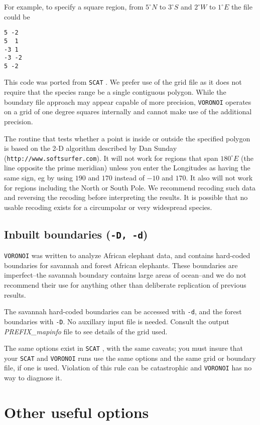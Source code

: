 \documentclass[10pt,titlepage,times,letterpaper]{article}
\def\SCAT{{\tt SCAT} }
\def\VORONOI{{\tt VORONOI} }
\begin{document}
For example, to specify a square region, from $5^\circ N$ to $3^\circ S$ and
$2^\circ W$ to $1^\circ E$ the file could be
\begin{verbatim}
5 -2
5  1
-3 1
-3 -2
5 -2
\end{verbatim}

This code was ported from \SCAT.  We prefer use of the grid file as it does not
require that the species range be a single contiguous polygon.  While the boundary
file approach may appear capable of more precision, \VORONOI operates on a grid of
one degree squares internally and cannot make use of the additional precision.

The routine that tests whether a point is inside or outside
the specified polygon is based on the 2-D algorithm 
described by Dan Sunday ({\tt http://www.softsurfer.com}). 
It will not work for regions that span
$180^\circ E$ (the line opposite the prime meridian) unless you enter
the Longitudes as having the same sign, eg by using $190$ and $170$
instead of $-10$ and $170$. It also will not work for regions
including the North or South Pole.   We recommend recoding such
data and reversing the recoding before interpreting the results.  It
is possible that no usable recoding exists for a circumpolar or very widespread species.

\subsection{Inbuilt boundaries ({\tt -D, -d})}

\VORONOI was written to analyze African elephant data, and contains hard-coded
boundaries for savannah and forest African elephants.  These boundaries are 
imperfect--the savannah boundary contains large areas of ocean--and we do not
recommend their use for anything other than deliberate replication of previous results.

The savannah hard-coded boundaries can be accessed with {\tt -d}, and the 
forest boundaries with {\tt -D}.  No auxillary input file is needed.  Consult
the output {\it PREFIX\_mapinfo} file to see details of the grid used.

The same options exist in \SCAT, with the same caveats; you must insure that your
\SCAT and \VORONOI runs use the same options and the same grid or boundary
file, if one is used.  Violation of this rule can be catastrophic and \VORONOI has
no way to diagnose it.

\section{Other useful options}
\end{document}
